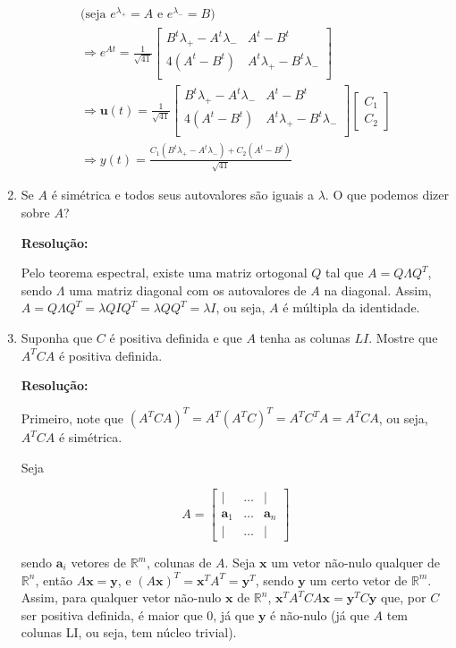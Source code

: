 \documentclass[leqno]{article}
\begin{document}
\begin{enumerate}
\begin{align*}
        \text{(seja $e^{\lambda_+}=A$ e $e^{\lambda_-}=B$)}\\
        \Rightarrow e^{At}=\frac{1}{\sqrt{41}}\begin{bmatrix}B^t\lambda_+-A^t\lambda_- & A^t-B^t\\
        4(A^t-B^t) & A^t\lambda_+-B^t\lambda_-\\
        \end{bmatrix}\\
        \Rightarrow \textbf{u}(t)=\frac{1}{\sqrt{41}}\begin{bmatrix}B^t\lambda_+-A^t\lambda_- & A^t-B^t\\
        4(A^t-B^t) & A^t\lambda_+-B^t\lambda_-\\
        \end{bmatrix}\begin{bmatrix}C_1\\
        C_2\end{bmatrix}\\
        \Rightarrow y(t)=\frac{C_1(B^t\lambda_+-A^t\lambda_-) + C_2(A^t-B^t)}{\sqrt{41}}
    \end{align*}
    
    \item Se $A$ é simétrica e todos seus autovalores são iguais a $\lambda$. O que podemos dizer sobre $A$?
    
    \textbf{Resolução:}
    
    Pelo teorema espectral, existe uma matriz ortogonal $Q$ tal que $A=Q\Lambda Q^T$, sendo $\Lambda$ uma matriz diagonal com os autovalores de $A$ na diagonal. Assim, $A=Q\Lambda Q^T=\lambda QIQ^T=\lambda QQ^T=\lambda I$, ou seja, $A$ é múltipla da identidade.

    \item Suponha que $C$ é positiva definida e que $A$ tenha as colunas $LI$. Mostre que $A^TCA$ é positiva definida.
    
    \textbf{Resolução:}
    
    Primeiro, note que $(A^TCA)^T=A^T(A^TC)^T=A^TC^TA=A^TCA$, ou seja, $A^TCA$ é simétrica.
    
    Seja
    
    $$A=\begin{bmatrix}
    | & \dots & |\\
    \textbf{a}_1 & \dots & \textbf{a}_n\\
    | & \dots & |\end{bmatrix}$$
    
    sendo $\textbf{a}_i$ vetores de $\mathbb{R}^m$, colunas de $A$. Seja $\textbf{x}$ um vetor não-nulo qualquer de $\mathbb{R}^n$, então $A\textbf{x}=\textbf{y}$, e $(A\textbf{x})^T=\textbf{x}^TA^T=\textbf{y}^T$, sendo $\textbf{y}$ um certo vetor de $\mathbb{R}^m$. Assim, para qualquer vetor não-nulo $\textbf{x}$ de $\mathbb{R}^n$, $\textbf{x}^TA^TCA\textbf{x}=\textbf{y}^TC\textbf{y}$ que, por $C$ ser positiva definida, é maior que $0$, já que $\textbf{y}$ é não-nulo (já que $A$ tem colunas LI, ou seja, tem núcleo trivial).
    

\end{enumerate}
\end{document}
